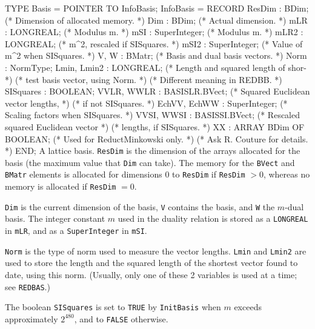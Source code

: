 TYPE
   Basis = POINTER TO InfoBasis;
   InfoBasis = RECORD
      ResDim     : BDim;             (* Dimension of allocated memory.      *)
      Dim        : BDim;             (* Actual dimension.                   *)
      mLR        : LONGREAL;         (* Modulus m.                          *)
      mSI        : SuperInteger;     (* Modulus m.                          *)
      mLR2       : LONGREAL;         (* m^2, rescaled if SISquares.         *)
      mSI2       : SuperInteger;     (* Value of m^2 when SISquares.        *)
      V, W       : BMatr;            (* Basis and dual basis vectors.       *)
      Norm       : NormType;
      Lmin, Lmin2  : LONGREAL;       (* Length and squared length of shor-  *)
                                     (* test basis vector, using Norm.      *)
                                     (* Different meaning in REDBB.         *)
      SISquares    : BOOLEAN;
      VVLR, WWLR   : BASISLR.BVect;  (* Squared Euclidean vector lengths,   *)
                                     (* if not SISquares.                   *)
      EchVV, EchWW : SuperInteger;   (* Scaling factors when SISquares.     *)
      VVSI, WWSI : BASISSI.BVect;    (* Rescaled squared Euclidean vector   *)
                                     (* lengths, if SISquares.              *)
      XX : ARRAY BDim OF BOOLEAN;    (* Used for ReductMinkowski only.      *)
                                     (* Ask R. Couture for details.         *)
      END;
\endcode
  \tabb
   A lattice basis.  
   {\tt ResDim} is the dimension of the arrays allocated for the basis
   (the maximum value that {\tt Dim} can take).
   The memory for the {\tt BVect} and {\tt BMatr} elements is allocated
   for dimensions 0 to {\tt ResDim} if {\tt ResDim} $> 0$, whereas
   no memory is allocated if {\tt ResDim} $= 0$.

   {\tt Dim} is the current dimension of the basis,
   {\tt V} contains the basis, and {\tt W} the $m$-dual basis. 
   The integer constant $m$ used in the duality relation is stored
   as a {\tt LONGREAL} in {\tt mLR}, and as a {\tt SuperInteger}
   in {\tt mSI}.

   {\tt Norm} is the type of norm used to measure the vector lengths.
   {\tt Lmin} and {\tt Lmin2} are used to store the length and the 
   squared length of the shortest vector found to date, using this norm.
   (Usually, only one of these 2 variables is used at a time; 
   see {\tt REDBAS}.)

   The boolean {\tt SISquares} is set to {\tt TRUE} by {\tt InitBasis}
   when $m$ exceeds approximately $2^{480}$, and to {\tt FALSE} otherwise.

